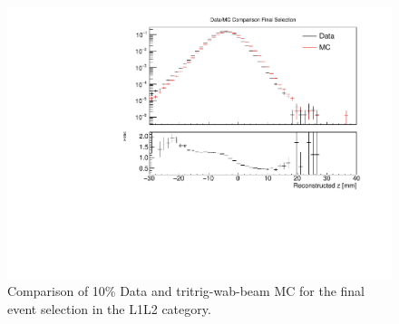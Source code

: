 \begin{figure}[!ht] 
    \centering
    \includegraphics[width=.85\textwidth]{figs/selection/final_compare_L1L2.pdf}
    \caption{
    	Comparison of 10\% Data and tritrig-wab-beam MC for the final event selection in the L1L2 category. %
    }
    \label{fig:singleV0_L1L2}
\end{figure}  

